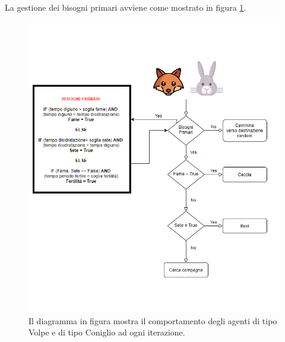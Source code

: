 \documentclass[11pt]{article}
\begin{document}
La gestione dei bisogni primari avviene come mostrato in figura \ref{fig:diagrammaComportamentale}. 
\begin{figure}
     \centering
     \includegraphics[scale = 0.75]{diagramma_comportamentale.png}
     \caption{Il diagramma in figura mostra il comportamento degli agenti di tipo Volpe e di tipo Coniglio ad ogni iterazione.}
     \label{fig:diagrammaComportamentale}
\end{figure}
\end{document}
